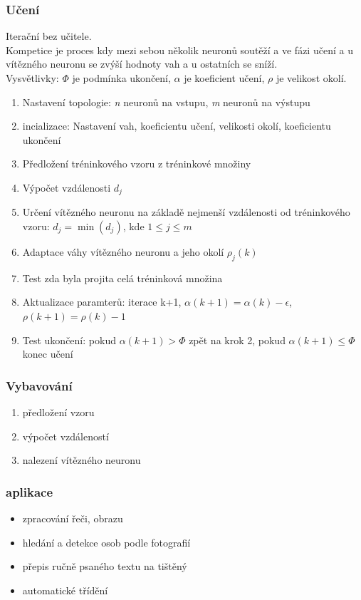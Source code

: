 \subsubsection{Učení}
Iterační bez učitele.\\
Kompetice je proces kdy mezi sebou několik neuronů soutěží a ve fázi učení a u vítězného neuronu se zvýší hodnoty vah a u ostatních se sníží.\\
Vysvětlivky: \(\Phi\) je podmínka ukončení, \(\alpha\) je koeficient učení, \(\rho\) je velikost okolí.\\
\begin{enumerate}
    \item Nastavení topologie: \textit{n} neuronů na vstupu, \textit{m} neuronů na výstupu
    \item incializace: Nastavení vah, koeficientu učení, velikosti okolí, koeficientu ukončení
    \item Předložení tréninkového vzoru z tréninkové množiny
    \item Výpočet vzdálenosti \(d_j\)
    \item Určení vítězného neuronu na základě nejmenší vzdálenosti od tréninkového vzoru: \(d_j = \min(d_j)\), kde \(1 \leq j \leq m \)
    \item Adaptace váhy vítězného neuronu a jeho okolí \(\rho_j(k)\)
    \item Test zda byla projita celá tréninková množina
    \item Aktualizace paramterů: iterace k+1, \(\alpha(k+1) = \alpha(k) - \epsilon\), \(\rho(k+1) = \rho(k) -1 \)
    \item Test ukončení: pokud \(\alpha(k+1) > \Phi\) zpět na krok 2, pokud \(\alpha(k+1) \leq \Phi\) konec učení
\end{enumerate}

\subsubsection{Vybavování}
\begin{enumerate}
    \item předložení vzoru
    \item výpočet vzdáleností
    \item nalezení vítězného neuronu
\end{enumerate}

\subsubsection{aplikace}
\begin{itemize}
    \item zpracování řeči, obrazu
    \item hledání a detekce osob podle fotografií
    \item přepis ručně psaného textu na tištěný
    \item automatické třídění
\end{itemize}
\newpage

